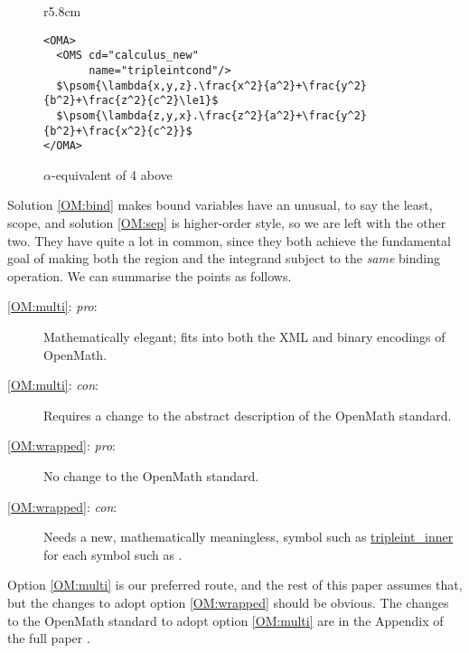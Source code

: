 \documentclass{llncs}
\begin{document}
\begin{wrapfigure}r{5.8cm}%
\lstset{mathescape,numbers=none,frame=none}
\begin{lstlisting}[mathescape]
<OMA>
  <OMS cd="calculus_new"
       name="tripleintcond"/>
  $\psom{\lambda{x,y,z}.\frac{x^2}{a^2}+\frac{y^2}{b^2}+\frac{z^2}{c^2}\le1}$
  $\psom{\lambda{z,y,x}.\frac{z^2}{a^2}+\frac{y^2}{b^2}+\frac{x^2}{c^2}}$
</OMA>
\end{lstlisting}%
\caption{$\alpha$-equivalent of 4 above}\label{fig:alpha}
\end{wrapfigure}
Solution \ref{OM:bind} makes bound variables have an unusual, to say the least, scope, and
solution \ref{OM:sep} is higher-order style, so we are left with the other two. They
have quite a lot in common, since they both achieve the fundamental goal of making both
the region and the integrand subject to the {\it same\/} binding operation. We can
summarise the points as follows.
\begin{description}
\item[\ref{OM:multi}: \emph{pro}:]Mathematically elegant; fits into both the
XML and binary encodings of OpenMath.
\item[\ref{OM:multi}: \emph{con}:]Requires a change to the abstract
description of the OpenMath standard.
\item[\ref{OM:wrapped}: \emph{pro}:]No change to the OpenMath standard.
\item[\ref{OM:wrapped}: \emph{con}:]Needs a new, mathematically meaningless,
symbol such as \url{tripleint_inner} for each symbol such as
{}.
\end{description}
Option \ref{OM:multi} is our preferred route, and the rest of this paper assumes that, but
the changes to adopt option \ref{OM:wrapped} should be obvious. The changes to the
OpenMath standard to adopt option \ref{OM:multi} are in the Appendix\iffull\else{} of the
full paper \cite{DavenportKohlhase2009b}\fi.
\end{document}
